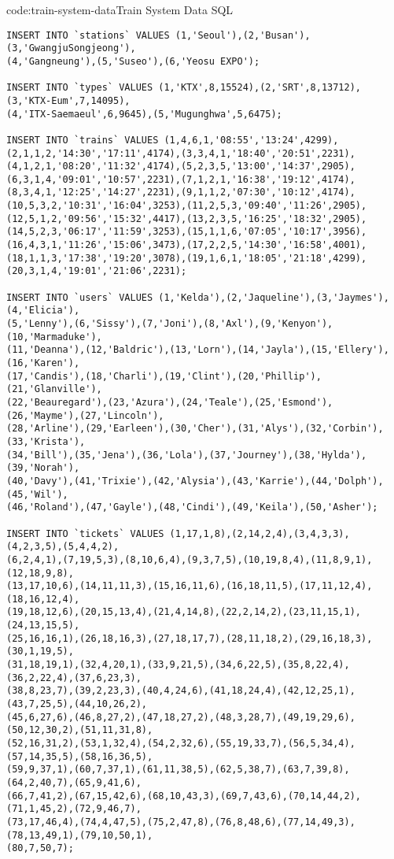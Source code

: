 \begin{codeenv}{code:train-system-data}{Train System Data SQL}\begin{verbatim}
INSERT INTO `stations` VALUES (1,'Seoul'),(2,'Busan'),(3,'GwangjuSongjeong'),
(4,'Gangneung'),(5,'Suseo'),(6,'Yeosu EXPO');

INSERT INTO `types` VALUES (1,'KTX',8,15524),(2,'SRT',8,13712),(3,'KTX-Eum',7,14095),
(4,'ITX-Saemaeul',6,9645),(5,'Mugunghwa',5,6475);

INSERT INTO `trains` VALUES (1,4,6,1,'08:55','13:24',4299),
(2,1,1,2,'14:30','17:11',4174),(3,3,4,1,'18:40','20:51',2231),
(4,1,2,1,'08:20','11:32',4174),(5,2,3,5,'13:00','14:37',2905),
(6,3,1,4,'09:01','10:57',2231),(7,1,2,1,'16:38','19:12',4174),
(8,3,4,1,'12:25','14:27',2231),(9,1,1,2,'07:30','10:12',4174),
(10,5,3,2,'10:31','16:04',3253),(11,2,5,3,'09:40','11:26',2905),
(12,5,1,2,'09:56','15:32',4417),(13,2,3,5,'16:25','18:32',2905),
(14,5,2,3,'06:17','11:59',3253),(15,1,1,6,'07:05','10:17',3956),
(16,4,3,1,'11:26','15:06',3473),(17,2,2,5,'14:30','16:58',4001),
(18,1,1,3,'17:38','19:20',3078),(19,1,6,1,'18:05','21:18',4299),
(20,3,1,4,'19:01','21:06',2231);

INSERT INTO `users` VALUES (1,'Kelda'),(2,'Jaqueline'),(3,'Jaymes'),(4,'Elicia'),
(5,'Lenny'),(6,'Sissy'),(7,'Joni'),(8,'Axl'),(9,'Kenyon'),(10,'Marmaduke'),
(11,'Deanna'),(12,'Baldric'),(13,'Lorn'),(14,'Jayla'),(15,'Ellery'),(16,'Karen'),
(17,'Candis'),(18,'Charli'),(19,'Clint'),(20,'Phillip'),(21,'Glanville'),
(22,'Beauregard'),(23,'Azura'),(24,'Teale'),(25,'Esmond'),(26,'Mayme'),(27,'Lincoln'),
(28,'Arline'),(29,'Earleen'),(30,'Cher'),(31,'Alys'),(32,'Corbin'),(33,'Krista'),
(34,'Bill'),(35,'Jena'),(36,'Lola'),(37,'Journey'),(38,'Hylda'),(39,'Norah'),
(40,'Davy'),(41,'Trixie'),(42,'Alysia'),(43,'Karrie'),(44,'Dolph'),(45,'Wil'),
(46,'Roland'),(47,'Gayle'),(48,'Cindi'),(49,'Keila'),(50,'Asher');

INSERT INTO `tickets` VALUES (1,17,1,8),(2,14,2,4),(3,4,3,3),(4,2,3,5),(5,4,4,2),
(6,2,4,1),(7,19,5,3),(8,10,6,4),(9,3,7,5),(10,19,8,4),(11,8,9,1),(12,18,9,8),
(13,17,10,6),(14,11,11,3),(15,16,11,6),(16,18,11,5),(17,11,12,4),(18,16,12,4),
(19,18,12,6),(20,15,13,4),(21,4,14,8),(22,2,14,2),(23,11,15,1),(24,13,15,5),
(25,16,16,1),(26,18,16,3),(27,18,17,7),(28,11,18,2),(29,16,18,3),(30,1,19,5),
(31,18,19,1),(32,4,20,1),(33,9,21,5),(34,6,22,5),(35,8,22,4),(36,2,22,4),(37,6,23,3),
(38,8,23,7),(39,2,23,3),(40,4,24,6),(41,18,24,4),(42,12,25,1),(43,7,25,5),(44,10,26,2),
(45,6,27,6),(46,8,27,2),(47,18,27,2),(48,3,28,7),(49,19,29,6),(50,12,30,2),(51,11,31,8),
(52,16,31,2),(53,1,32,4),(54,2,32,6),(55,19,33,7),(56,5,34,4),(57,14,35,5),(58,16,36,5),
(59,9,37,1),(60,7,37,1),(61,11,38,5),(62,5,38,7),(63,7,39,8),(64,2,40,7),(65,9,41,6),
(66,7,41,2),(67,15,42,6),(68,10,43,3),(69,7,43,6),(70,14,44,2),(71,1,45,2),(72,9,46,7),
(73,17,46,4),(74,4,47,5),(75,2,47,8),(76,8,48,6),(77,14,49,3),(78,13,49,1),(79,10,50,1),
(80,7,50,7);
\end{verbatim}
\end{codeenv}
